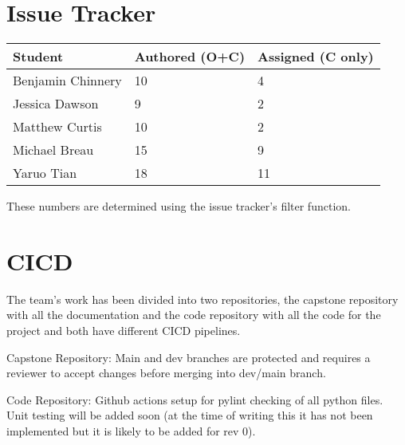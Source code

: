 \documentclass{article}
\begin{document}
\section{Issue Tracker}

\begin{table}[H]
\centering
\begin{tabular}{lll}
\toprule
\textbf{Student} & \textbf{Authored (O+C)} & \textbf{Assigned (C only)}\\
\midrule
Benjamin Chinnery & 10 & 4 \\
Jessica Dawson& 9 & 2 \\
Matthew Curtis & 10 & 2 \\
Michael Breau & 15 & 9 \\
Yaruo Tian & 18 & 11 \\
\bottomrule
\end{tabular}
\end{table}

These numbers are determined using the issue tracker's filter function.

\section{CICD}

The team's work has been divided into two repositories, the capstone repository with all the documentation and the code repository with all the code for the project and both have different CICD pipelines.

Capstone Repository: Main and dev branches are protected and requires a reviewer to accept changes before merging into dev/main branch.

Code Repository: Github actions setup for pylint checking of all python files. Unit testing will be added soon (at the time of writing this it has not been implemented but it is likely to be added for rev 0).
\end{document}
